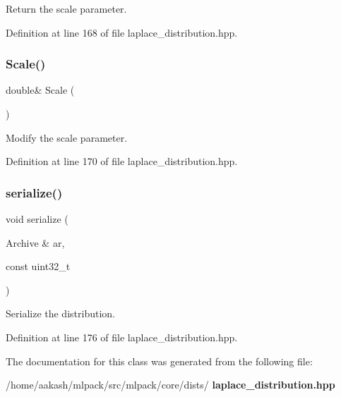 Return the scale parameter. 



Definition at line 168 of file laplace\+\_\+distribution.\+hpp.

\mbox{\label{classmlpack_1_1distribution_1_1LaplaceDistribution_a8190151e4134e9f69f1f51cd013ba43c}} 
\subsubsection{Scale()\hspace{0.1cm}{\footnotesize\ttfamily [2/2]}}
{\footnotesize\ttfamily double\& Scale (\begin{DoxyParamCaption}{ }\end{DoxyParamCaption})\hspace{0.3cm}{\ttfamily [inline]}}



Modify the scale parameter. 



Definition at line 170 of file laplace\+\_\+distribution.\+hpp.

\mbox{\label{classmlpack_1_1distribution_1_1LaplaceDistribution_a65cba07328997659bec80b9879b15a51}} 
\subsubsection{serialize()}
{\footnotesize\ttfamily void serialize (\begin{DoxyParamCaption}\item[{Archive \&}]{ar,  }\item[{const uint32\+\_\+t}]{ }\end{DoxyParamCaption})\hspace{0.3cm}{\ttfamily [inline]}}



Serialize the distribution. 



Definition at line 176 of file laplace\+\_\+distribution.\+hpp.



The documentation for this class was generated from the following file\+:\begin{DoxyCompactItemize}
\item 
/home/aakash/mlpack/src/mlpack/core/dists/\textbf{ laplace\+\_\+distribution.\+hpp}\end{DoxyCompactItemize}
